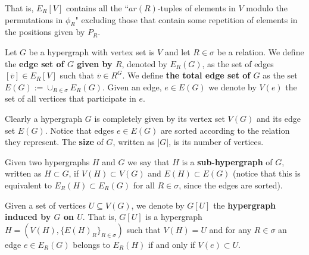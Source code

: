 \documentclass[12pt,notitlepage,a4paper]{article}
\theoremstyle{definition}
\begin{document}
That is, $E_R[V]$ contains all the ``$ar(R)$-tuples of elements
in $V$ modulo the permutations
in $\phi_R$" 
excluding those that contain some repetition of elements in
the positions given by $P_R$.\par
Let $G$ be a hypergraph with vertex set is $V$ and let $R\in \sigma$
be a relation. 
We define the \textbf{edge set of $G$ given by $R$}, denoted by $E_R(G)$, 
as the set of edges $[\overline{v}]\in E_R[V]$ such that $\overline{v}\in R^G$. 
We define \textbf{the total edge set of $G$} as the set $E(G):=\cup_{R\in \sigma} E_R(G)$.
Given an edge, $e\in E(G)$ we denote by $V(e)$
the set of all vertices that participate in $e$. 
\par
Clearly a hypergraph $G$ is completely given by its vertex set $V(G)$ and its edge 
set $ E(G)$. Notice that edges $e\in E(G)$ are sorted according to the relation they represent. The \textbf{size} of $G$, written as $|G|$, is its number of vertices. 
\par

Given two hypergraphs $H$ and $G$ we say that $H$
is a \textbf{sub-hypergraph} of $G$, written as $H\subset G$,
if $V(H)\subset V(G)$ and $E(H)\subset E(G)$ (notice 
that this is equivalent to $E_R(H)\subset E_R(G)$ for all
$R\in \sigma$, since the edges are sorted).\par


Given a set of vertices $U\subseteq V(G)$, 
we denote by $G[U]$ the \textbf{hypergraph induced
by $G$ on $U$}. That is, $G[U]$ is a hypergraph
$H=(V(H),\{E(H)_R\}_{R\in \sigma})$ such that 
$V(H)=U$ and for any $R\in \sigma$ 
an edge $e\in E_R(G)$ belongs 
to $E_R(H)$ if and only if $V(e)\subset U$.
\par
\end{document}
